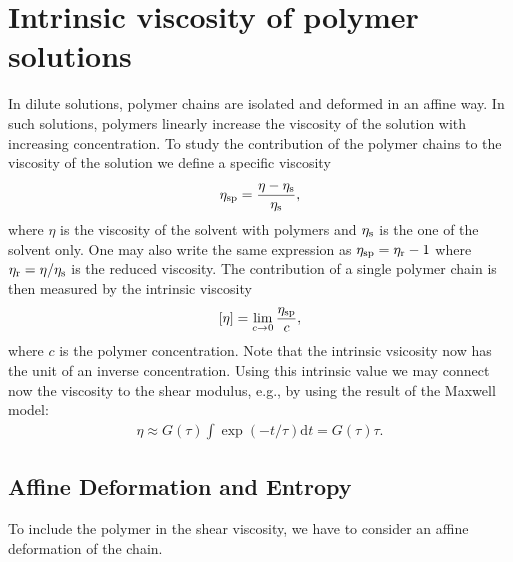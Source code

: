 \documentclass[letterpaper,10pt,english]{sphinxmanual}
\begin{document}
\section{Intrinsic viscosity of polymer solutions}
\label{\detokenize{notebooks/L25/1_polymer_dynamics:Intrinsic-viscosity-of-polymer-solutions}}
\sphinxAtStartPar
In dilute solutions, polymer chains are isolated and deformed in an affine way. In such solutions, polymers linearly increase the viscosity of the solution with increasing concentration. To study the contribution of the polymer chains to the viscosity of the solution we define a specific viscosity
\begin{equation*}
\begin{split}\eta_{\rm sp}=\frac{\eta-\eta_{\rm s}}{\eta_{\rm s}},\end{split}
\end{equation*}
\sphinxAtStartPar
where \(\eta\) is the viscosity of the solvent with polymers and \(\eta_{\rm s}\) is the one of the solvent only. One may also write the same expression as \(\eta_{\rm sp}=\eta_{\rm r}-1\) where \(\eta_{\rm r}=\eta/\eta_{\rm s}\) is the reduced viscosity. The contribution of a single polymer chain is then measured by the intrinsic viscosity
\begin{equation*}
\begin{split}[\eta]=\lim_{c\rightarrow 0}\frac{\eta_{\rm sp}}{c},\end{split}
\end{equation*}
\sphinxAtStartPar
where \(c\) is the polymer concentration. Note that the intrinsic vsicosity now has the unit of an inverse concentration. Using this intrinsic value we may connect now the viscosity to the shear modulus, e.g., by using the result of the Maxwell model:
\begin{equation*}
\begin{split}\eta \approx G(\tau)\int \exp(-t/\tau)\mathrm{d}t=G(\tau)\tau.\end{split}
\end{equation*}

\subsection{Affine Deformation and Entropy}
\label{\detokenize{notebooks/L25/1_polymer_dynamics:Affine-Deformation-and-Entropy}}
\sphinxAtStartPar
To include the polymer in the shear viscosity, we have to consider an affine deformation of the chain.

\sphinxAtStartPar
{}
\end{document}
